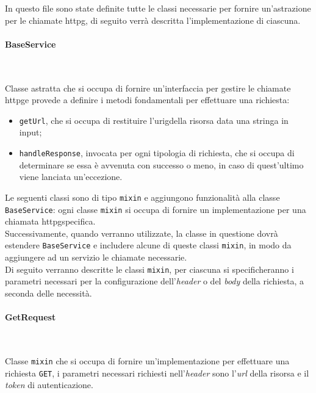 In questo file sono state definite tutte le classi necessarie per fornire un'astrazione per le chiamate \gls{httpg}\glsoccur, di seguito verrà descritta l'implementazione di ciascuna.

\paragraph*{BaseService} ~ \\
\label{par:base-service}

\noindent Classe astratta che si occupa di fornire un'interfaccia per gestire le chiamate \gls{httpg}\glsoccur e provede a definire i metodi fondamentali per effettuare una richiesta:
\begin{itemize}
    \item \lstinline{getUrl}, che si occupa di restituire l'\gls{urig}\glsoccur della risorsa data una stringa in input;
    \item \lstinline{handleResponse}, invocata per ogni tipologia di richiesta, che si occupa di determinare se essa è avvenuta con successo o meno, in caso di quest'ultimo viene lanciata un'eccezione.
\end{itemize}
Le seguenti classi sono di tipo \lstinline{mixin}\cite{site:mixins} e aggiungono funzionalità alla classe \lstinline{BaseService}: ogni classe \lstinline{mixin} si occupa di fornire un implementazione per una chiamata \gls{httpg}\glsoccur specifica. \\
Successivamente, quando verranno utilizzate, la classe in questione dovrà estendere \lstinline{BaseService} e includere alcune di queste classi \lstinline{mixin}, in modo da aggiungere ad un servizio le chiamate necessarie.\\
Di seguito verranno descritte le classi \lstinline{mixin}, per ciascuna si specificheranno i parametri necessari per la configurazione dell'\emph{header} o del \emph{body} della richiesta, a seconda delle necessità. \\

\paragraph*{GetRequest} ~ \\
\label{par:get-request}

\noindent Classe \lstinline{mixin} che si occupa di fornire un'implementazione per effettuare una richiesta \lstinline{GET}, i parametri necessari richiesti nell'\emph{header} sono l'\emph{url} della risorsa e il \emph{token} di autenticazione.


